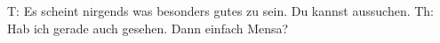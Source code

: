 T: Es scheint nirgends was besonders gutes zu sein. Du kannst aussuchen.
Th: Hab ich gerade auch gesehen. Dann einfach Mensa? 